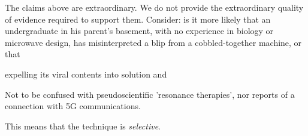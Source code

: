 \documentclass[paper.tex]{subfiles}
\begin{document}
\begin{multicols}{1}
The claims above are extraordinary. We do not provide the extraordinary quality of evidence required to support them. Consider: is it more likely that an undergraduate in his parent's basement, with no experience in biology or microwave design, has misinterpreted a blip from a cobbled-together machine, or that 

expelling its viral contents into solution and 

Not to be confused with pseudoscientific 'resonance therapies', nor reports of a connection with 5G communications.

This means that the technique is {\it selective}.




\end{multicols}
\end{document}
